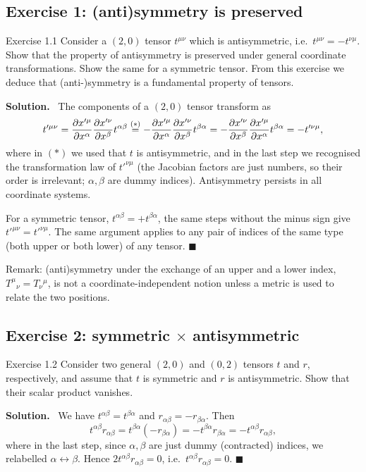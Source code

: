 \documentclass[11pt,a4paper]{article}
\numberwithin{equation}{subsection}
\newenvironment{solution}{\par\noindent\textbf{\textcolor{excol!70!black}{Solution.}}\ }{\hfill$\blacksquare$\par\medskip}
\newcommand{\added}[1]{{\color{teal!60!black}#1}}
\begin{document}
\subsection{Exercise 1: (anti)symmetry is preserved}
\begin{problem}{Exercise 1.1}
Consider a $(2,0)$ tensor $t^{\mu\nu}$ which is antisymmetric, i.e.\ $t^{\mu\nu}=-t^{\nu\mu}$. Show that the property of antisymmetry is preserved under general coordinate transformations. Show the same for a symmetric tensor. From this exercise we deduce that (anti-)symmetry is a fundamental property of tensors.
\end{problem}
\begin{solution}
The components of a $(2,0)$ tensor transform as
\[
  t'^{\mu\nu}=\frac{\partial x'^\mu}{\partial x^\alpha}\frac{\partial x'^\nu}{\partial x^\beta}t^{\alpha\beta}
  \overset{(\ast)}{=}-\frac{\partial x'^\mu}{\partial x^\alpha}\frac{\partial x'^\nu}{\partial x^\beta}t^{\beta\alpha}
  =-\frac{\partial x'^\nu}{\partial x^\beta}\frac{\partial x'^\mu}{\partial x^\alpha}t^{\beta\alpha}=-t'^{\nu\mu},
\]
where in $(\ast)$ we used that $t$ is antisymmetric, and in the last step we recognised the transformation law of $t'^{\nu\mu}$ (the Jacobian factors are just numbers, so their order is irrelevant; $\alpha,\beta$ are dummy indices). Antisymmetry persists in all coordinate systems.

For a symmetric tensor, $t^{\alpha\beta}=+t^{\beta\alpha}$, the same steps without the minus sign give $t'^{\mu\nu}=t'^{\nu\mu}$. The same argument applies to any pair of indices of the same type (both upper or both lower) of any tensor.
\end{solution}
\added{Remark: (anti)symmetry under the exchange of an upper and a lower index, $T^\mu{}_\nu=T_\nu{}^\mu$, is not a coordinate-independent notion unless a metric is used to relate the two positions.}

\subsection{Exercise 2: symmetric $\times$ antisymmetric}
\begin{problem}{Exercise 1.2}
Consider two general $(2,0)$ and $(0,2)$ tensors $t$ and $r$, respectively, and assume that $t$ is symmetric and $r$ is antisymmetric. Show that their scalar product vanishes.
\end{problem}
\begin{solution}
We have $t^{\alpha\beta}=t^{\beta\alpha}$ and $r_{\alpha\beta}=-r_{\beta\alpha}$. Then
\[
  t^{\alpha\beta}r_{\alpha\beta}=t^{\beta\alpha}(-r_{\beta\alpha})=-t^{\beta\alpha}r_{\beta\alpha}=-t^{\alpha\beta}r_{\alpha\beta},
\]
where in the last step, since $\alpha,\beta$ are just dummy (contracted) indices, we relabelled $\alpha\leftrightarrow\beta$. Hence $2t^{\alpha\beta}r_{\alpha\beta}=0$, i.e.\ $t^{\alpha\beta}r_{\alpha\beta}=0$.
\end{solution}
\end{document}
